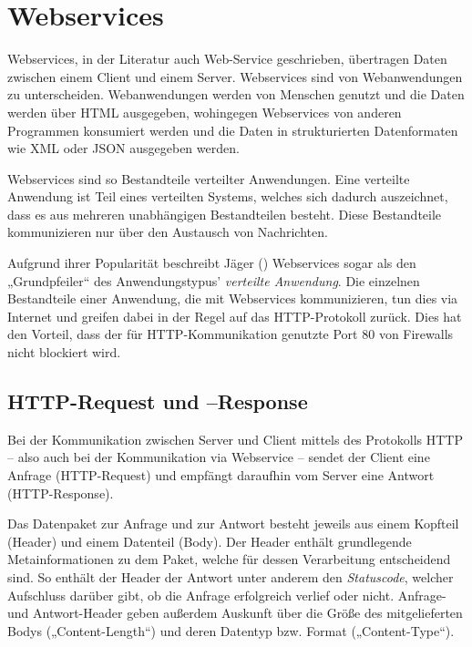 \chapter{Webservices}
\label{cha:Webservices}
Webservices, in der Literatur auch Web-Service geschrieben, übertragen Daten zwischen einem Client und einem Server. \cite[S. 5]{Burbiel.2007} Webservices sind von Webanwendungen zu unterscheiden. Webanwendungen werden von Menschen genutzt und die Daten werden über HTML ausgegeben, wohingegen Webservices von anderen Programmen konsumiert werden und die Daten in strukturierten Datenformaten wie \ac{XML} oder \ac{JSON} ausgegeben werden. \cite[S. 93]{Safran.2013}

Webservices sind so Bestandteile verteilter Anwendungen. Eine verteilte Anwendung ist Teil eines verteilten Systems, welches sich dadurch auszeichnet, dass es aus mehreren unabhängigen Bestandteilen besteht. Diese Bestandteile kommunizieren nur über den Austausch von Nachrichten. \cite[S. 5]{Schill.2012}

Aufgrund ihrer Popularität beschreibt Jäger (\citeyear[S. 205]{Jager.2008}) Webservices sogar als den „Grundpfeiler“ des Anwendungstypus' \emph{verteilte Anwendung}. Die einzelnen Bestandteile einer Anwendung, die mit Webservices kommunizieren, tun dies via Internet und greifen dabei in der Regel auf das \ac{HTTP}-Protokoll zurück. \cite[S. 21-23]{Burbiel.2007} Dies hat den Vorteil, dass der für \ac{HTTP}-Kommunikation genutzte Port 80 von Firewalls nicht blockiert wird. \cite[S. 205]{Jager.2008}

\section{HTTP-Request und –Response}
\label{cha:WS_HTTP_RR}
Bei der Kommunikation zwischen Server und Client mittels des Protokolls \ac{HTTP} – also auch bei der Kommunikation via Webservice – sendet der Client eine Anfrage (\ac{HTTP}-Request) und empfängt daraufhin vom Server eine Antwort (\ac{HTTP}-Response). \cite[S. 194]{Heiderich.2009}

Das Datenpaket zur Anfrage und zur Antwort besteht jeweils aus einem Kopfteil (Header) und einem Datenteil (Body). Der Header enthält grundlegende Metainformationen zu dem Paket, welche für dessen Verarbeitung entscheidend sind. So enthält der Header der Antwort unter anderem den \emph{Statuscode}, welcher Aufschluss darüber gibt, ob die Anfrage erfolgreich verlief oder nicht. Anfrage- und Antwort-Header geben außerdem Auskunft über die Größe des mitgelieferten Bodys („Content-Length“) und deren Datentyp bzw. Format („Content-Type“). \cite[S. 194-195]{Heiderich.2009}

